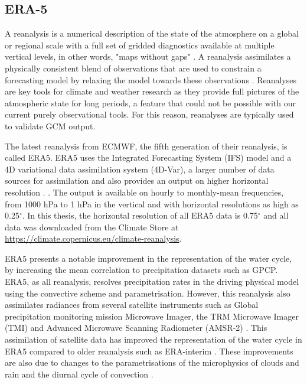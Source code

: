 \subsection{ERA-5}


A reanalysis is a numerical description of the state of the atmosphere on a global or regional scale with a full set of gridded diagnostics available at multiple vertical levels, in other words, "maps without gaps" \citep{era5hersbach}. A reanalysis assimilates a physically consistent blend of observations that are used to constrain a forecasting model by relaxing the model towards these observations \citep[e.g.][]{fujiwara2021}.
Reanalyses are key tools for climate and weather research as they provide full pictures of the atmospheric state for long periods, a feature that could not be possible with our current purely observational tools. For this reason, reanalyses are typically used to validate GCM output. 

The latest reanalysis from ECMWF, the fifth generation of their reanalysis, is called ERA5. 
ERA5 uses the Integrated Forecasting System (IFS) model and a 4D variational data assimilation system (4D-Var), a larger number of data sources for assimilation and also provides an output on higher horizontal resolution \citep{era5hersbach}. . The output is available on hourly to monthly-mean frequencies, from 1000 hPa to 1 hPa in the vertical and with horizontal resolutions as high as 0.25$^\circ$. In this thesis, the horizontal resolution of all ERA5 data is 0.75$^\circ$ and all data was downloaded from the Climate Store at  \url{https://climate.copernicus.eu/climate-reanalysis}.

ERA5 presents a notable improvement in the representation of the water cycle, by increasing the mean correlation to precipitation datasets such as GPCP. 
ERA5, as all reanalysis, resolves precipitation rates in the driving physical model using the convective scheme and parametrisation. However, this reanalysis also assimilates radiances from several satellite instruments such as Global precipitation monitoring mission Microwave Imager, the TRM Microwave Imager (TMI) and Advanced Microwave Scanning Radiometer (AMSR-2) \cite{era5hersbach}. This assimilation of satellite data has improved the representation of the water cycle in ERA5 compared to older reanalysis such as ERA-interim \citep[e.g.][]{henin2018assessing}. These improvements are also due to changes to the parametrisations of the microphysics of clouds and rain \citep{forbes2014} and the diurnal cycle of convection \citep{bechtold2014}. 


